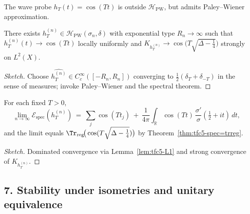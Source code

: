 The wave probe $h_T(t)=\cos(Tt)$ is outside $\mathcal{H}_{\mathrm{PW}}$, but admits Paley--Wiener approximation. \relax\hspace{0pt}
\begin{lemma}\relax\hspace{0pt}
\label{lem:tfc5-wavePW} %
There exists $h_T^{(n)}\in\mathcal{H}_{\mathrm{PW}}(\sigma_n,\delta)$ with exponential type $R_n\to\infty$ such that $h_T^{(n)}(t)\to \cos(Tt)$ locally uniformly and $K_{h_T^{(n)}}\to \cos\!\big(T\sqrt{\Delta-\tfrac14}\big)$ strongly on $L^2(X)$. \relax\hspace{0pt}
\end{lemma}

\begin{proof}[Sketch]\relax\hspace{0pt}
Choose $\widehat{h_T^{(n)}}\in C_c^\infty([-R_n,R_n])$ converging to $\tfrac12(\delta_{T}+\delta_{-T})$ in the sense of measures; invoke Paley--Wiener and the spectral theorem. \relax\hspace{0pt}
\end{proof}

\begin{proposition}\relax\hspace{0pt}
\label{prop:tfc5-wave-limit} %
For each fixed $T>0$,
\[
\lim_{n\to\infty} \mathcal{E}_{\mathrm{spec}}(h_T^{(n)})\ =\ \sum_{j}\cos(T t_j)\ +\ \frac{1}{4\pi}\int_{\mathbb{R}} \cos(T t)\,\frac{\sigma'}{\sigma}\!\left(\tfrac12+it\right)\,dt,
\]
and the limit equals $\Tr_{\mathrm{reg}}\!\big(\cos(T\sqrt{\Delta-\tfrac14})\big)$ by Theorem~\ref{thm:tfc5-spec=trreg}. \relax\hspace{0pt}
\end{proposition}

\begin{proof}[Sketch]\relax\hspace{0pt}
Dominated convergence via Lemma~\ref{lem:tfc5-L1} and strong convergence of $K_{h_T^{(n)}}$. \relax\hspace{0pt}
\end{proof}

\subsection*{7. Stability under isometries and unitary equivalence}\relax\hspace{0pt}
\label{subsec:tfc5-stability} %

